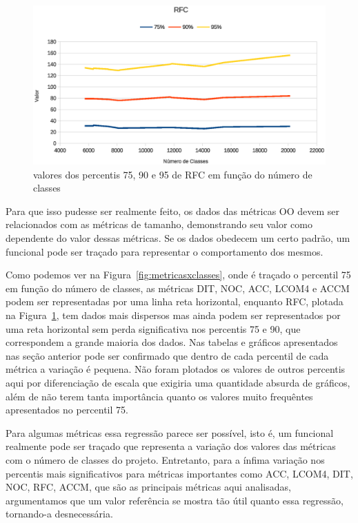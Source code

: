 \begin{figure}[!htb]
\centering
\includegraphics [keepaspectratio=true,scale=0.7]{figuras/rfcxclasses.eps}
\caption{valores dos percentis 75, 90 e 95 de RFC em função do número de classes}
\label{fig:rfcxclasses}
\end{figure}

Para que isso pudesse ser realmente feito, os dados das métricas OO devem ser relacionados com as métricas de tamanho, demonstrando seu valor como dependente do valor dessas métricas. Se os dados obedecem um certo padrão, um funcional pode ser traçado para representar o comportamento dos mesmos. 

Como podemos ver na Figura~\ref{fig:metricasxclasses}, onde é traçado o percentil 75 em função do número de classes, as métricas DIT, NOC, ACC, LCOM4 e ACCM podem ser representadas por uma linha reta horizontal, enquanto RFC, plotada na Figura~\ref{fig:rfcxclasses}, tem dados mais dispersos mas ainda podem ser representados por uma reta horizontal sem perda significativa nos percentis 75 e 90, que correspondem a grande maioria dos dados. Nas tabelas e gráficos apresentados nas seção anterior pode ser confirmado que dentro de cada percentil de cada métrica a variação é pequena. Não foram plotados os valores de outros percentis aqui por diferenciação de escala que exigiria uma quantidade absurda de gráficos, além de não terem tanta importância quanto os valores muito frequêntes apresentados no percentil 75.

Para algumas métricas essa regressão parece ser possível, isto é, um funcional realmente pode ser traçado que representa a variação dos valores das métricas com o número de classes do projeto. Entretanto, para a ínfima variação nos percentis mais significativos para métricas importantes como ACC, LCOM4, DIT, NOC, RFC, ACCM, que são as principais métricas aqui analisadas, argumentamos que um valor referência se mostra tão útil quanto essa regressão, tornando-a desnecessária.


